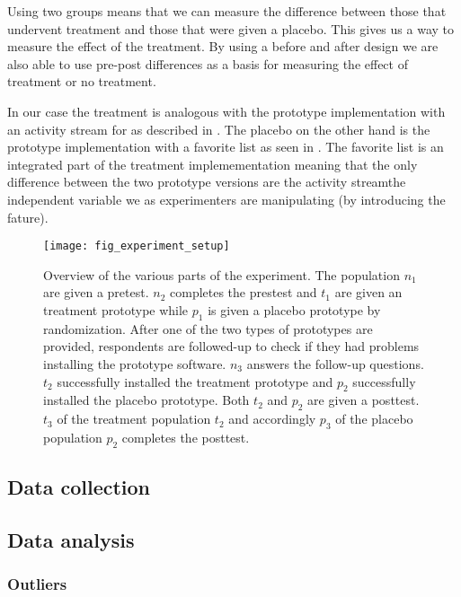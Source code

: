 Using two groups means that we can measure the difference between those that
undervent treatment and those that were given a placebo. This gives us a way
to measure the effect of the treatment.
By using a before and after design we are also able to use pre-post
differences as a basis for measuring the effect of treatment or no
treatment.

In our case the treatment is analogous with the prototype implementation with
an activity stream for \urort{} as described in
.
The placebo on the other hand is the 
prototype implementation with a favorite list as seen in
\label{section:implementation.design.favorite.list}.
The favorite list is an integrated part of the treatment implemementation
meaning that the only difference between the two prototype versions are
the activity stream\dash{}the independent variable we as experimenters are
manipulating (by introducing the fature).

\begin{figure}
  \texttt{[image: fig\_experiment\_setup]}
  \caption[Experiment Overview]{
    Overview of the various parts of the experiment. The population $n_1$
    are given a pretest. $n_2$ completes the prestest and $t_1$ are given
    an treatment prototype while $p_1$ is given a placebo
    prototype by randomization.
    After one of the two types of prototypes are provided, respondents are
    followed-up to check if they had problems installing the prototype
    software. $n_3$ answers the follow-up questions.
    $t_2$ successfully installed the treatment prototype and $p_2$
    successfully installed the placebo prototype. Both $t_2$ and $p_2$ are
    given a posttest.
    $t_3$ of the treatment population $t_2$ and accordingly $p_3$ of the
    placebo population $p_2$ completes the posttest.
  }
  \label{figure:fig.experiment.setup}
\end{figure}

\subsection{Data collection}

\subsection{Data analysis}

\subsubsection{Outliers}

